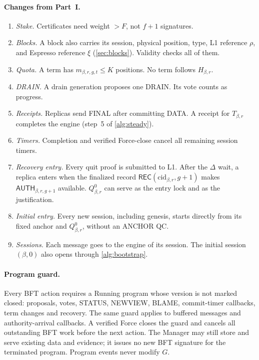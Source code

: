 \documentclass[11pt,a4paper]{article}
\newcommand{\tagg}[1]{\ensuremath{\mathsf{#1}}}
\begin{document}
\paragraph{Changes from Part~I.}
\begin{enumerate}[label=\arabic*.]
\item \emph{Stake.} Certificates need weight $>F$, not $f+1$ signatures.
\item \emph{Blocks.} A block also carries its session, physical
position, type, L1 reference $\rho$, and Espresso reference $\xi$
(\cref{sec:blocks}). Validity checks all of them.
\item \emph{Quota.} A term has $m_{\beta,r,g,t}\le K$ positions. No term
follows $H_{\beta,r}$.
\item \emph{DRAIN.} A drain generation proposes one DRAIN. Its vote
counts as progress.
\item \emph{Receipts.} Replicas send FINAL after committing DATA. A
receipt for $T_{\beta,r}$ completes the engine (step~5 of \cref{alg:steady}).
\item \emph{Timers.} Completion and verified Force-close cancel all
remaining session timers.
\item \emph{Recovery entry.} Every quit proof is submitted to L1. After
the $\Delta$ wait, a replica enters when the finalized record
$\tagg{REC}(\mathrm{cid}_{\beta,r},g+1)$ makes $\tagg{AUTH}_{\beta,r,g+1}$
available. $Q_{\beta,r}^0$ can serve as the entry lock and as the
justification.
\item \emph{Initial entry.} Every new session, including genesis, starts
directly from its fixed anchor and $Q^0_{\beta,r}$, without an ANCHOR QC.
\item \emph{Sessions.} Each message goes to the engine of its session.
The initial session $(\beta,0)$ also opens through \cref{alg:bootstrap}.
\end{enumerate}

\paragraph{Program guard.}
Every BFT action requires a Running program whose version is not marked
closed: proposals, votes, STATUS, NEWVIEW, BLAME, commit-timer callbacks,
term changes and recovery. The same guard applies to buffered messages
and authority-arrival callbacks. A verified Force closes the guard and
cancels all outstanding BFT work before the next action. The Manager may
still store and serve existing data and evidence; it issues no new BFT
signature for the terminated program. Program events never modify $G$.
\end{document}
